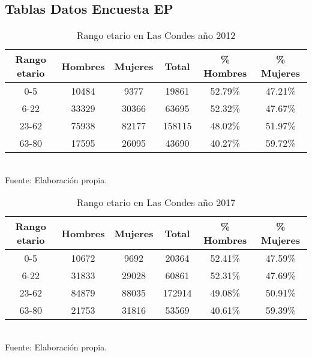 \documentclass[12pt]{article} %
\begin{document}
\subsection{Tablas Datos Encuesta EP}

\begin{table}[H]
    \centering
    \caption{Rango etario en Las Condes año 2012}
    \vspace{0.2cm}
    \begin{tabular}{|c|c|c|c|c|c|}
        \hline
        \textbf{Rango etario} & \textbf{Hombres} & \textbf{Mujeres} & \textbf{Total} & \textbf{\% Hombres} & \textbf{\% Mujeres} \\ \hline
        0-5 & 10484 & 9377 & 19861 & 52.79\% & 47.21\% \\ \hline
        6-22 & 33329 & 30366 & 63695 & 52.32\% & 47.67\% \\ \hline
        23-62 & 75938 & 82177 & 158115 & 48.02\% & 51.97\% \\ \hline
        63-80 & 17595 & 26095 & 43690 & 40.27\% & 59.72\% \\ \hline
    \end{tabular}
    \label{Cuadro 4}
    \vspace{0.2cm}
    \\Fuente: Elaboración propia.
\end{table}

\begin{table}[H]
    \centering
    \caption{Rango etario en Las Condes año 2017}
    \vspace{0.2cm}
    \begin{tabular}{|c|c|c|c|c|c|}
        \hline
        \textbf{Rango etario} & \textbf{Hombres} & \textbf{Mujeres} & \textbf{Total} & \textbf{\% Hombres} & \textbf{\% Mujeres} \\ \hline
        0-5 & 10672 & 9692 & 20364 & 52.41\% & 47.59\% \\ \hline
        6-22 & 31833 & 29028 & 60861 & 52.31\% & 47.69\% \\ \hline
        23-62 & 84879 & 88035 & 172914 & 49.08\% & 50.91\% \\ \hline
        63-80 & 21753 & 31816 & 53569 & 40.61\% & 59.39\% \\ \hline
    \end{tabular}
    \label{Cuadro 5}
    \vspace{0.2cm}
    \\Fuente: Elaboración propia.
\end{table}
\end{document}
